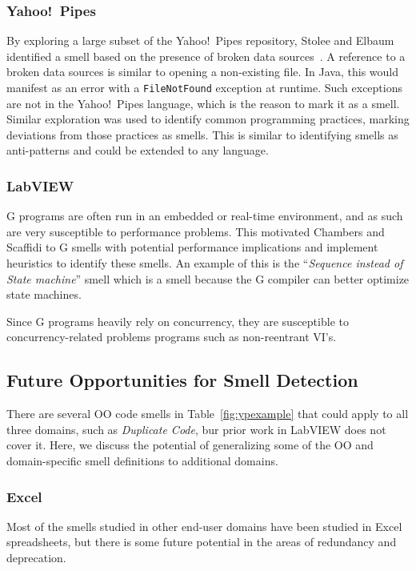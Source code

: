 \documentclass[10pt,conference,compsocconf]{IEEEtran}
\begin{document}
\subsubsection{Yahoo!\ Pipes}
By exploring a large subset of the Yahoo!\ Pipes repository, Stolee and Elbaum identified a smell based on the presence of broken data sources~\cite{StoleeTSE2013}.
A reference to a broken data sources  is similar to opening a non-existing file.
In Java, this would manifest as an error with a {\tt FileNotFound} exception at runtime.
Such exceptions are not in the Yahoo!\ Pipes language, which is the reason to mark it as a smell. 
Similar exploration was used to  identify common programming practices, marking deviations from those practices as smells. 
This is similar to identifying  smells  as anti-patterns  and could be extended to any language. 


\subsubsection{LabVIEW}

G programs are often run in an embedded or real-time environment, and as such are very susceptible to performance problems. This motivated Chambers and Scaffidi \cite{chambers2013smell} to G smells with potential performance implications and implement heuristics to identify these smells.
An example of this is the ``\textit{Sequence instead of State machine}'' smell which is a smell because the G compiler can better optimize state machines.

Since G programs heavily rely on concurrency, they are susceptible to  concurrency-related problems programs such as non-reentrant VI's.


\subsection{Future Opportunities for Smell Detection}
\label{subsec:futuresmells}
There are several OO code smells in Table~\ref{fig:ypexample} that could apply to all three domains, such as \emph{Duplicate Code}, bur prior work in LabVIEW does not cover it. Here, we discuss the potential of generalizing some of the OO and domain-specific smell definitions to additional domains. 

\subsubsection{Excel}
Most of the smells studied in other end-user domains have been studied in Excel spreadsheets, but there is some future potential in the areas of redundancy and deprecation.
\end{document}
